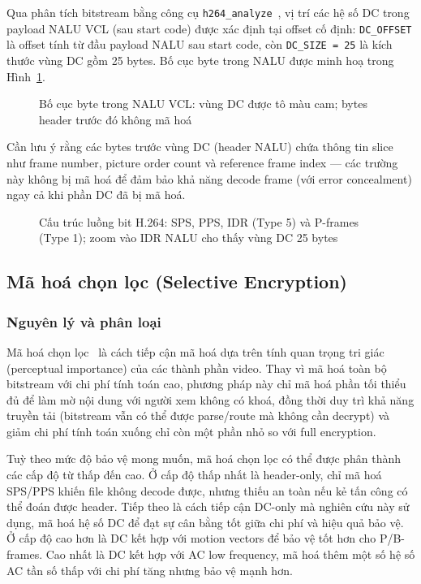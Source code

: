 Qua phân tích bitstream bằng công cụ \texttt{h264\_analyze}~\cite{h264bitstream}, vị trí các hệ số DC trong payload NALU VCL (sau start code) được xác định tại offset cố định: \texttt{DC\_OFFSET} là offset tính từ đầu payload NALU sau start code, còn \texttt{DC\_SIZE = 25} là kích thước vùng DC gồm 25 bytes. Bố cục byte trong NALU được minh hoạ trong Hình~\ref{fig:dc_offset}.

\begin{figure}[ht]
\centering

\caption{Bố cục byte trong NALU VCL: vùng DC được tô màu cam;
         bytes header trước đó không mã hoá}
\label{fig:dc_offset}
\end{figure}

Cần lưu ý rằng các bytes trước vùng DC (header NALU) chứa thông tin slice như frame number, picture order count và reference frame index --- các trường này không bị mã hoá để đảm bảo khả năng decode frame (với error concealment) ngay cả khi phần DC đã bị mã hoá.

\begin{figure}[ht]
\centering

\caption{Cấu trúc luồng bit H.264: SPS, PPS, IDR (Type 5) và P-frames (Type 1);
         zoom vào IDR NALU cho thấy vùng DC 25 bytes}
\label{fig:nalu_structure}
\end{figure}

\subsection{Mã hoá chọn lọc (Selective Encryption)}

\subsubsection{Nguyên lý và phân loại}

Mã hoá chọn lọc~\cite{cheng_selective} là cách tiếp cận mã hoá dựa trên tính quan trọng tri giác (perceptual importance) của các thành phần video. Thay vì mã hoá toàn bộ bitstream với chi phí tính toán cao, phương pháp này chỉ mã hoá phần tối thiểu đủ để làm mờ nội dung với người xem không có khoá, đồng thời duy trì khả năng truyền tải (bitstream vẫn có thể được parse/route mà không cần decrypt) và giảm chi phí tính toán xuống chỉ còn một phần nhỏ so với full encryption.

Tuỳ theo mức độ bảo vệ mong muốn, mã hoá chọn lọc có thể được phân thành các cấp độ từ thấp đến cao. Ở cấp độ thấp nhất là header-only, chỉ mã hoá SPS/PPS khiến file không decode được, nhưng thiếu an toàn nếu kẻ tấn công có thể đoán được header. Tiếp theo là cách tiếp cận DC-only mà nghiên cứu này sử dụng, mã hoá hệ số DC để đạt sự cân bằng tốt giữa chi phí và hiệu quả bảo vệ. Ở cấp độ cao hơn là DC kết hợp với motion vectors để bảo vệ tốt hơn cho P/B-frames. Cao nhất là DC kết hợp với AC low frequency, mã hoá thêm một số hệ số AC tần số thấp với chi phí tăng nhưng bảo vệ mạnh hơn.

